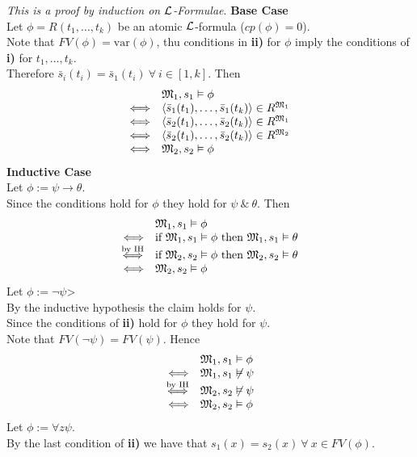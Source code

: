 \documentclass[11pt,a4paper]{article}
\begin{document}
\textit{This is a proof by induction on $\mathcal{L}$-Formulae}.
\textbf{Base Case}\\
Let $\phi=R(t_1,\dots,t_k)$ be an atomic $\mathcal{L}$-formula (\ie $cp(\phi)=0$).\\
Note that $FV(\phi)=\text{var}(\phi)$, thu conditions in \textbf{ii)} for $\phi$ imply the conditions of \textbf{i)} for $t_1,\dots,t_k$.\\
Therefore $\bar{s}_i(t_i)=\bar{s}_1(t_i)\ \forall\ i\in[1,k]$. Then
\[\begin{array}{rl}
&\mathfrak{M}_1,s_1\vDash\phi\\
\Longleftrightarrow&\langle\bar{s}_1(t_1),\dots,\bar{s}_1(t_k)\rangle\in R^{\mathfrak{M}_1}\\
\Longleftrightarrow&\langle\bar{s}_2(t_1),\dots,\bar{s}_2(t_k)\rangle\in R^{\mathfrak{M}_1}\\
\Longleftrightarrow&\langle\bar{s}_2(t_1),\dots,\bar{s}_2(t_k)\rangle\in R^{\mathfrak{M}_2}\\
\Longleftrightarrow&\mathfrak{M}_2,s_2\vDash\phi
\end{array}\]
\textbf{Inductive Case}\\
Let $\phi:=\psi\to\theta$.\\
Since the conditions hold for $\phi$ they hold for $\psi\ \&\ \theta$. Then
\[\begin{array}{rl}
&\mathfrak{M}_1,s_1\vDash\phi\\
\Longleftrightarrow&\text{if }\mathfrak{M}_1,s_1\vDash\phi\text{ then }\mathfrak{M}_1,s_1\vDash\theta\\
\overset{\text{by IH}}{\Longleftrightarrow}&\text{if }\mathfrak{M}_2,s_2\vDash\phi\text{ then }\mathfrak{M}_2,s_2\vDash\theta\\
\Longleftrightarrow&\mathfrak{M}_2,s_2\vDash\phi
\end{array}\]
Let $\phi:=\neg\psi$>\\
By the inductive hypothesis the claim holds for $\psi$.\\
Since the conditions of \textbf{ii)} hold for $\phi$ they hold for $\psi$.\\
Note that $FV(\neg\psi)=FV(\psi)$. Hence
\[\begin{array}{rl}
&\mathfrak{M}_1,s_1\vDash\phi\\
\Longleftrightarrow&\mathfrak{M}_1,s_1\not\vDash\psi\\
\overset{\text{by IH}}{\Longleftrightarrow}&\mathfrak{M}_2,s_2\not\vDash\psi\\
\Longleftrightarrow&\mathfrak{M}_2,s_2\vDash\phi
\end{array}\]
Let $\phi:=\forall z\psi$.\\
By the last condition of \textbf{ii)} we have that $s_1(x)=s_2(x)\ \forall\ x\in FV(\phi)$.\\
\end{document}
